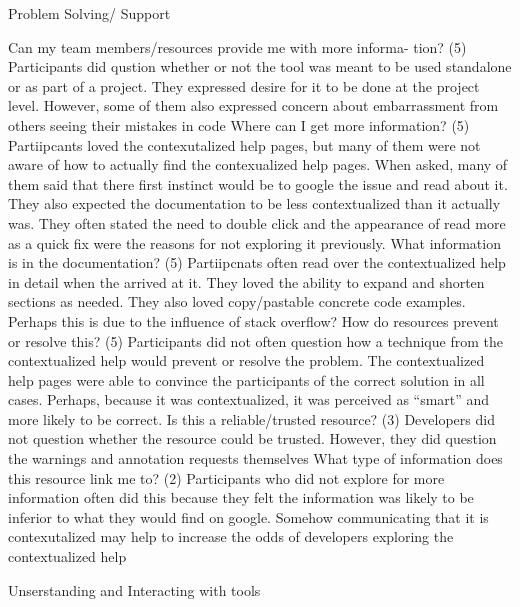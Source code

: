 \documentclass[twoside,letterpaper]{soups}
\begin{document}
Problem Solving/ Support

Can my team members/resources provide me with more informa-
tion? (5) Participants did qustion whether or not the tool was meant to be used standalone or as part of a project. They expressed desire for it to be done at the project level. However, some of them also expressed concern about embarrassment from others seeing their mistakes in code
Where can I get more information? (5) Partiipcants loved the contexutalized help pages, but many of them were not aware of how to actually find the contexualized help pages. When asked, many of them said that there first instinct would be to google the issue and read about it. They also expected the documentation to be less contextualized than it actually was. They often stated the need to double click and the appearance of read more as a quick fix were the reasons for not exploring it previously. 
What information is in the documentation? (5) Partiipcnats often read over the contextualized help in detail when the arrived at it. They loved the ability to expand and shorten sections as needed. They also loved copy/pastable concrete code examples. Perhaps this is due to the influence of stack overflow?
How do resources prevent or resolve this? (5) Participants did not often question how a technique from the contextualized help would prevent or resolve the problem. The contextualized help pages were able to convince the participants of the correct solution in all cases. Perhaps, because it was contextualized, it was perceived as “smart” and more likely to be correct. 
Is this a reliable/trusted resource? (3) Developers did not question whether the resource could be trusted. However, they did question the warnings and annotation requests themselves
What type of information does this resource link me to? (2) Participants who did not explore for more information often did this because they felt the information was likely to be inferior to what they would find on google. Somehow communicating that it is contexutalized may help to increase the odds of developers exploring the contextualized help


Unserstanding and Interacting with tools
\end{document}
